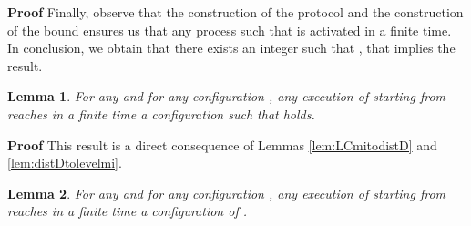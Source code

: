 \documentclass[11pt]{article}
\newenvironment{proof}{\noindent\textbf{Proof}}{\hfill\qed}
\newcommand{\qed}{\hfill}
\newtheorem{lem}{Lemma}
\newenvironment{lemma}[1]{\vspace{-0.25cm}\begin{lem}#1}{\end{lem}\vspace{-0.3cm}}
\begin{document}
\begin{proof}
Finally, observe that the construction of the protocol and the construction of the bound  ensures us that any process  such that  is activated in a finite time. In conclusion, we obtain that there exists an integer  such that , that implies the result.
\end{proof}

\begin{lemma}\label{lem:CmitoIMmi+1}
For any  and for any configuration , any execution of  starting from  reaches in a finite time a configuration  such that  holds.
\end{lemma}

\begin{proof}
This result is a direct consequence of Lemmas \ref{lem:LCmitodistD} and \ref{lem:distDtolevelmi}.
\end{proof}

\begin{lemma}\label{lem:LCmitoLCmi+1}
For any  and for any configuration , any execution of  starting from  reaches in a finite time a configuration of .
\end{lemma}
\end{document}
